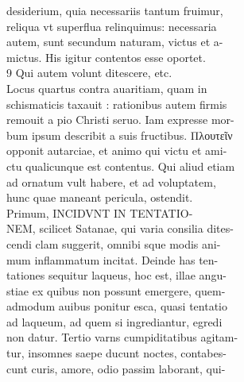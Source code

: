 \documentclass{article}
\begin{document}
\begin{pages}
                desiderium, quia necessariis tantum fruimur, \\
                reliqua vt superflua relinquimus: necessaria \\
                autem, sunt secundum naturam, victus et a- \\
                mictus. His igitur contentos esse oportet. \\
                9 Qui autem volunt ditescere, etc. \\
                Locus quartus contra auaritiam, quam in \\
                schismaticis taxauit : rationibus autem firmis \\
                remouit a pio Christi seruo. Iam expresse mor- \\
                bum ipsum describit a suis fructibus. Πλουτεῖν \\
                opponit autarciae, et animo qui victu et ami- \\
                ctu qualicunque est contentus. Qui aliud etiam \\
                ad ornatum vult habere, et ad voluptatem, \\
                hunc quae maneant pericula, ostendit. \\
                Primum, INCIDVNT IN TENTATIO- \\
                NEM, scilicet Satanae, qui varia consilia dites- \\
                cendi clam suggerit, omnibi sque modis ani- \\
                mum inflammatum incitat. Deinde has ten- \\
                tationes sequitur laqueus, hoc est, illae angu- \\
                stiae ex quibus non possunt emergere, quem- \\
                admodum auibus ponitur esca, quasi tentatio \\
                ad laqueum, ad quem si ingrediantur, egredi \\
                non datur. Tertio varns cumpiditatibus agitam- \\
                tur, insomnes saepe ducunt noctes, contabes- \\
                cunt curis, amore, odio passim laborant, qui- \\

\end{pages}
\end{document}
